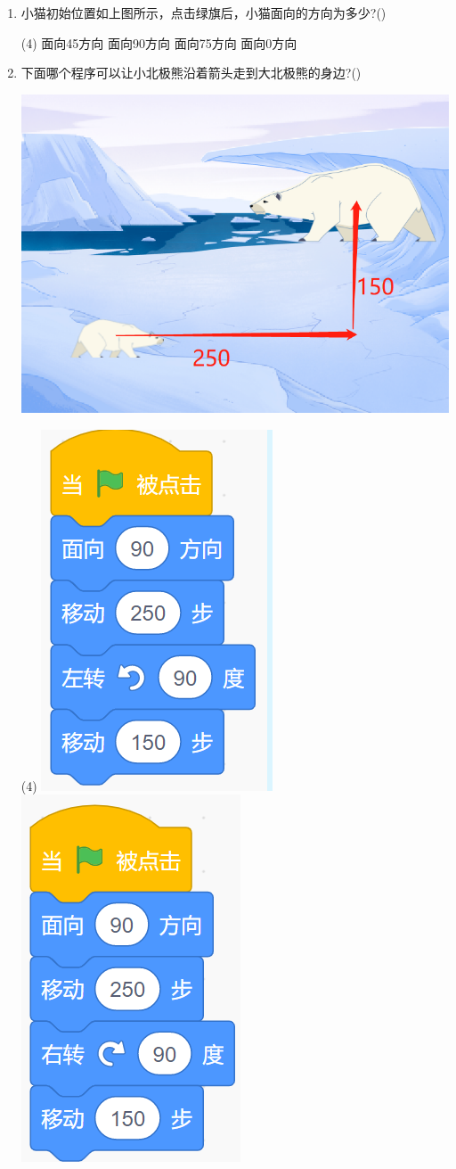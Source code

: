 \documentclass[10pt, a4paper]{article}
\begin{document}
\begin{enumerate}
        \item 小猫初始位置如上图所示，点击绿旗后，小猫面向的方向为多少?(\qquad)
        \begin{tasks}(4)
            \task 面向45方向
            \task 面向90方向
            \task 面向75方向
            \task 面向0方向
        \end{tasks}

        \item  下面哪个程序可以让小北极熊沿着箭头走到大北极熊的身边?(\qquad)
        
        \begin{minipage}{.2\textwidth}
            \includegraphics[width=\textwidth]{23.png}
        \end{minipage}
        \begin{minipage}{.7\textwidth}
            \begin{tasks}(4)
                \task \includegraphics[width=.12\textwidth]{23a.png}
                \task \includegraphics[width=.12\textwidth]{23b.png}

\end{tasks}
\end{minipage}
\end{enumerate}
\end{document}
